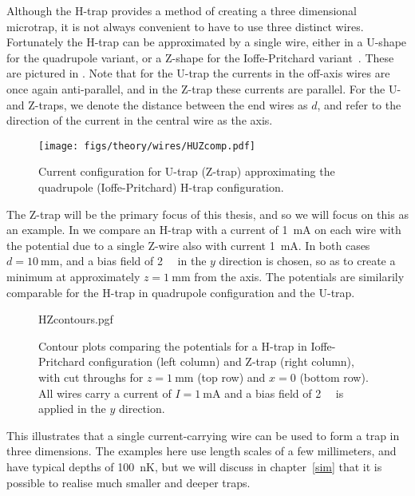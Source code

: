 Although the H-trap provides a method of creating a three dimensional
microtrap, it is not always convenient to have to use three distinct wires.
Fortunately the H-trap can be approximated by a single wire, either in a
U-shape for the quadrupole variant, or a Z-shape for the Ioffe-Pritchard
variant~\cite{2011Ac}. These are pictured in . Note
that for the U-trap the currents in the off-axis wires are once again
anti-parallel, and in the Z-trap these currents are parallel. For the U- and
Z-traps, we denote the distance between the end wires as $d$, and refer
to the direction of the current in the central wire as the axis.

\begin{figure}[htbp]
  \centering
  \texttt{[image: figs/theory/wires/HUZcomp.pdf]}
  \caption{Current configuration for U-trap (Z-trap) approximating the
  quadrupole (Ioffe-Pritchard) H-trap configuration.}
  \label{theory:fig:HUZ}
\end{figure}

The Z-trap will be the primary focus of this thesis, and so we will focus on
this as an example. In  we compare an H-trap
with a current of \SI{1}{\milli\ampere} on each wire with the potential due to
a single Z-wire also with current \SI{1}{\milli\ampere}. In both cases
$d=\SI{10}{\milli\meter}$, and a bias field of \SI{2}{\milli\gauss} in the $y$
direction is chosen, so as to create a minimum at approximately
$z=\SI{1}{\milli\meter}$ from the axis. The potentials are similarily
comparable for the H-trap in quadrupole configuration and the U-trap.

\begin{figure}[htbp]
  \centering
  {HZcontours.pgf}
  \caption{Contour plots comparing the potentials for a H-trap in
    Ioffe-Pritchard configuration (left column) and Z-trap (right column), with
    cut throughs for $z=\SI{1}{\milli\meter}$ (top row) and $x=0$ (bottom row).
    All wires carry a current of $I=\SI{1}{\milli\ampere}$ and a bias field of
    \SI{2}{\milli\gauss} is applied in the $y$ direction.}
  \label{theory:fig:HZcontours}
\end{figure}

This illustrates that a single current-carrying wire can be used to form a trap
in three dimensions. The examples here use length scales of a few millimeters,
and have typical depths of \SI{100}{\nano\kelvin}, but we will discuss in
chapter~\ref{sim} that it is possible to realise much smaller and deeper traps.


